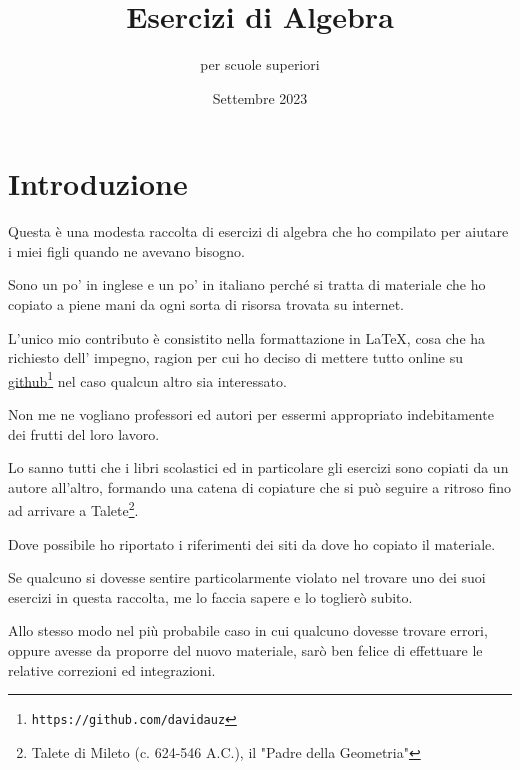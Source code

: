 \documentclass[a4paper,14pt]{extarticle}
\title{Esercizi di Algebra}
\author{per scuole superiori}
\date{Settembre 2023}
\begin{document}
\maketitle
\tableofcontents
\newpage

\section{Introduzione}

Questa è una modesta raccolta di esercizi di algebra che ho compilato per aiutare i
miei figli quando ne avevano bisogno.

Sono un po' in inglese e un po' in italiano perché
si tratta di materiale che ho copiato a piene mani da ogni sorta di risorsa trovata su internet.

L'unico mio contributo è consistito nella formattazione in  \LaTeX, cosa che ha richiesto 
dell' impegno, ragion per cui ho deciso di mettere tutto online su \href{https://github.com/davidauz}{github}\footnote{\texttt{https://github.com/davidauz}}
nel caso qualcun altro sia interessato.

Non me ne vogliano professori ed autori per essermi appropriato indebitamente dei frutti del loro lavoro.

Lo sanno tutti che i libri scolastici ed in particolare gli esercizi sono copiati da un autore all'altro,
formando una catena di copiature che si può seguire a ritroso fino ad arrivare a 
Talete\footnote{Talete di Mileto (c. 624-546 A.C.), il "Padre della Geometria"}.

Dove possibile ho riportato i riferimenti dei siti da dove ho copiato il materiale.

Se qualcuno si dovesse sentire particolarmente violato nel trovare uno dei suoi esercizi in 
questa raccolta, me lo faccia sapere e lo toglierò subito.

Allo stesso modo nel più probabile caso in cui qualcuno dovesse trovare errori, oppure avesse da proporre del 
nuovo materiale, sarò ben felice di effettuare le relative correzioni ed integrazioni.













\end{document}
